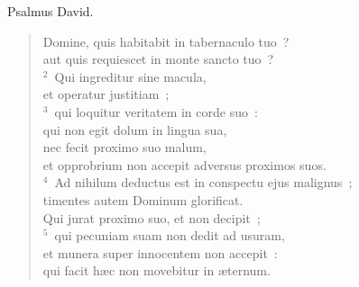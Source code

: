 \bchapter
\lettrine[lines=3,image=true,loversize=0.05,lraise=-0.03]{P}{}salmus David. \begin{flushleft}\begin{verse}\vspace{6pt}Domine, quis habitabit in tabernaculo tuo~?\\ aut quis requiescet in monte sancto tuo~?\\
${}^{2}$~Qui ingreditur sine macula,\\ et operatur justitiam~;\\
${}^{3}$~qui loquitur veritatem in corde suo~:\\ qui non egit dolum in lingua sua,\\ nec fecit proximo suo malum,\\ et opprobrium non accepit adversus proximos suos.\\
${}^{4}$~Ad nihilum deductus est in conspectu ejus malignus~;\\ timentes autem Dominum glorificat.\\ Qui jurat proximo suo, et non decipit~;\\
${}^{5}$~qui pecuniam suam non dedit ad usuram,\\ et munera super innocentem non accepit~:\\ qui facit h\ae c non movebitur in \ae ternum.\end{verse}\end{flushleft}



